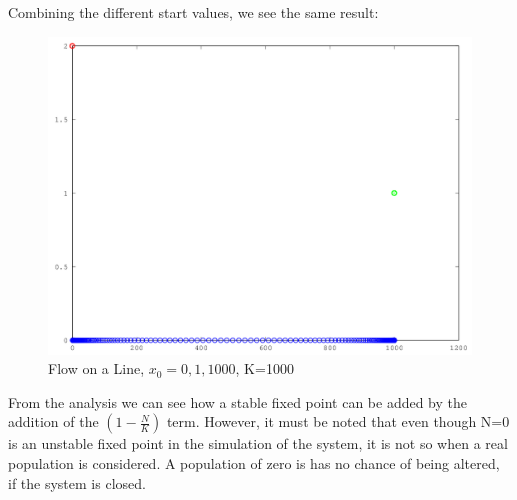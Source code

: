 \documentclass{article}
\begin{document}
\begin{enumerate}
		Combining the different start values, we see the same result:
		\begin{figure}[H]
			\caption{Flow on a Line, $x_0=0,1,1000$, K=1000 }
			\includegraphics[width=\textwidth]{growthFunction2}
		\end{figure}
		
		From the analysis we can see how a stable fixed point can be added by the addition of the $(1-\frac{N}{K})$ term. However, it must be noted that even though N=0 is an unstable fixed point in the simulation of the system, it is not so when a real population is considered. A population of zero is has no chance of being altered, if the system is closed.
\end{enumerate}
\end{document}
